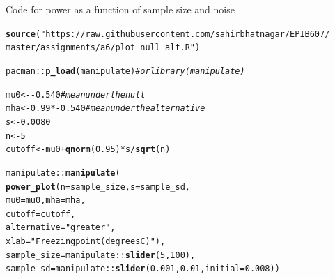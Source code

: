 \documentclass[10pt]{beamer}\usepackage[]{graphicx}\usepackage[]{color}
\makeatletter
\newcommand{\hlnum}[1]{\textcolor[rgb]{0.686,0.059,0.569}{#1}}%
\newcommand{\hlstr}[1]{\textcolor[rgb]{0.192,0.494,0.8}{#1}}%
\newcommand{\hlcom}[1]{\textcolor[rgb]{0.678,0.584,0.686}{\textit{#1}}}%
\newcommand{\hlopt}[1]{\textcolor[rgb]{0,0,0}{#1}}%
\newcommand{\hlstd}[1]{\textcolor[rgb]{0.345,0.345,0.345}{#1}}%
\newcommand{\hlkwb}[1]{\textcolor[rgb]{0.69,0.353,0.396}{#1}}%
\newcommand{\hlkwc}[1]{\textcolor[rgb]{0.333,0.667,0.333}{#1}}%
\newcommand{\hlkwd}[1]{\textcolor[rgb]{0.737,0.353,0.396}{\textbf{#1}}}%
\newenvironment{kframe}{%
 \def\at@end@of@kframe{}%
 \ifinner\ifhmode%
  \def\at@end@of@kframe{\end{minipage}}%
  \begin{minipage}{\columnwidth}%
 \fi\fi%
 \def\FrameCommand##1{\hskip\@totalleftmargin \hskip-\fboxsep
 \colorbox{shadecolor}{##1}\hskip-\fboxsep
     \hskip-\linewidth \hskip-\@totalleftmargin \hskip\columnwidth}%
 \MakeFramed {\advance\hsize-\width
   \@totalleftmargin\z@ \linewidth\hsize
   \@setminipage}}%
 {\par\unskip\endMakeFramed%
 \at@end@of@kframe}
\newenvironment{knitrout}{}{} %
\makeatother
\begin{document}
\begin{frame}[fragile]{Code for power as a function of sample size and noise}
\begin{knitrout}\tiny
{}\color{fgcolor}\begin{kframe}
\begin{alltt}
\hlkwd{source}\hlstd{(}\hlstr{"https://raw.githubusercontent.com/sahirbhatnagar/EPIB607/
master/assignments/a6/plot_null_alt.R"}\hlstd{)}

\hlstd{pacman}\hlopt{::}\hlkwd{p_load}\hlstd{(manipulate)} \hlcom{# or library(manipulate)}

\hlstd{mu0} \hlkwb{<-} \hlopt{-}\hlnum{0.540} \hlcom{# mean under the null}
\hlstd{mha} \hlkwb{<-} \hlnum{0.99}\hlopt{*-}\hlnum{0.540} \hlcom{# mean under the alternative}
\hlstd{s} \hlkwb{<-} \hlnum{0.0080}
\hlstd{n} \hlkwb{<-} \hlnum{5}
\hlstd{cutoff} \hlkwb{<-} \hlstd{mu0} \hlopt{+} \hlkwd{qnorm}\hlstd{(}\hlnum{0.95}\hlstd{)} \hlopt{*} \hlstd{s} \hlopt{/} \hlkwd{sqrt}\hlstd{(n)}

\hlstd{manipulate}\hlopt{::}\hlkwd{manipulate}\hlstd{(}
\hlkwd{power_plot}\hlstd{(}\hlkwc{n} \hlstd{= sample_size,} \hlkwc{s} \hlstd{= sample_sd,}
\hlkwc{mu0} \hlstd{= mu0,} \hlkwc{mha} \hlstd{= mha,}
\hlkwc{cutoff} \hlstd{= cutoff,}
\hlkwc{alternative} \hlstd{=} \hlstr{"greater"}\hlstd{,}
\hlkwc{xlab} \hlstd{=} \hlstr{"Freezing point (degrees C)"}\hlstd{),}
\hlkwc{sample_size} \hlstd{= manipulate}\hlopt{::}\hlkwd{slider}\hlstd{(}\hlnum{5}\hlstd{,} \hlnum{100}\hlstd{),}
\hlkwc{sample_sd} \hlstd{= manipulate}\hlopt{::}\hlkwd{slider}\hlstd{(}\hlnum{0.001}\hlstd{,} \hlnum{0.01}\hlstd{,} \hlkwc{initial} \hlstd{=} \hlnum{0.008}\hlstd{))}
\end{alltt}
\end{kframe}
\end{knitrout}
\end{frame}
\end{document}
